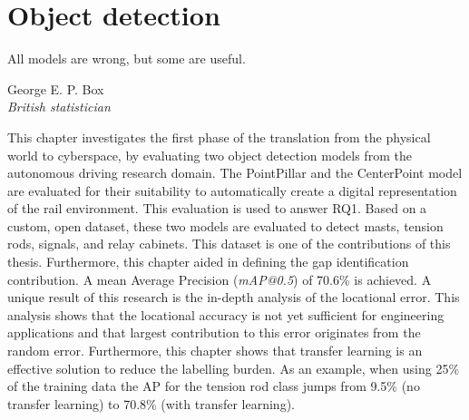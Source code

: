 \chapter{Object detection}\label{chap:objdet}
\epigraph{All models are wrong, but some are useful.}{George E. P. Box\\\textit{British statistician}}

This chapter investigates the first phase of the translation from the physical world to cyberspace, by evaluating two object detection models from the autonomous driving research domain.  The PointPillar and the CenterPoint model are evaluated for their suitability to automatically create a digital representation of the rail environment. This evaluation is used to answer RQ1. Based on a custom, open dataset, these two models are evaluated to detect masts, tension rods, signals, and relay cabinets. This dataset is one of the contributions of this thesis. Furthermore, this chapter aided in defining the gap identification contribution. A mean Average Precision (\textit{mAP@0.5}) of 70.6\% is achieved. A unique result of this research is the in-depth analysis of the locational error. This analysis shows that the locational accuracy is not yet sufficient for engineering applications and that largest contribution to this error originates from the random error. Furthermore, this chapter shows that transfer learning is an effective solution to reduce the labelling burden. As an example, when using 25\% of the training data the AP for the tension rod class jumps from 9.5\% (no transfer learning) to 70.8\% (with transfer learning). 

\clearpage


\clearpage
\printbibliography[heading=subbibnumbered]